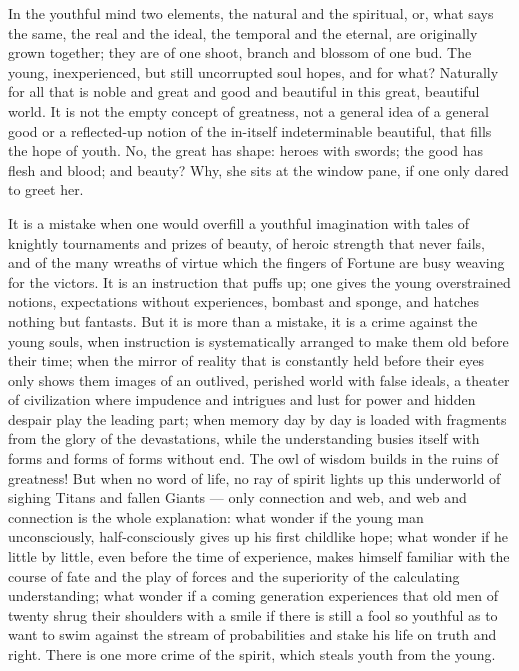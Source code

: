 \documentclass[12pt,a4paper,openany]{book}
\newcommand{\opage}[1]{\marginnote{\footnotesize\textit{[#1]}}}
\begin{document}
In the youthful mind two elements, the
natural and the spiritual, or, what says the
same, the real and the ideal, the temporal and
the eternal, are originally grown together; they are of one shoot,
branch and blossom of one bud. The young, inexperienced,
but still uncorrupted soul hopes, and for what?
Naturally for all that is noble and great and good
and beautiful in this great, beautiful world. It is not
the empty concept of greatness, not a general idea of
a general good or a reflected-up notion
of the in-itself indeterminable beautiful, that fills the hope of youth.
No, the great has shape: heroes with swords;
the good has flesh and blood; and beauty? Why, she sits
at the window pane, if one only dared to greet her.

It is a mistake when one would overfill a youthful
imagination with tales of knightly tournaments and
prizes of beauty, of heroic strength that never fails, and
of the many wreaths of virtue which the fingers of Fortune
are busy weaving for the victors. It is an
instruction that puffs up; one gives the young overstrained
notions, expectations without experiences,
bombast and sponge, and hatches nothing but fantasts. But it
is more than a mistake, it is a crime against
the young souls, when instruction is systematically arranged
to make them old before their time; when the
mirror of reality that is constantly held before their eyes only
shows them images of an outlived, perished world
with false ideals, a theater of civilization where
impudence and intrigues and lust for power and hidden despair
play the leading part; when memory day by day
\setcounter{footnote}{0}%
\opage{22}is loaded with fragments from the glory of the devastations,
while the understanding busies itself with forms and forms of
forms without end. The owl of wisdom builds in the ruins of
greatness! But when no word of life, no ray of
spirit lights up this underworld of sighing Titans
and fallen Giants --- only connection and web, and
web and connection is the whole explanation: what
wonder if the young man unconsciously, half-consciously gives up his
first childlike hope; what wonder if he little by
little, even before the time of experience, makes himself familiar with
the course of fate and the play of forces and the superiority of the calculating
understanding; what wonder if a coming
generation experiences that old men of twenty shrug their
shoulders with a smile if there is still a fool so
youthful as to want to swim against the stream of probabilities
and stake his life on truth and right. There is
one more crime of the spirit, which steals youth from
the young.
\end{document}
